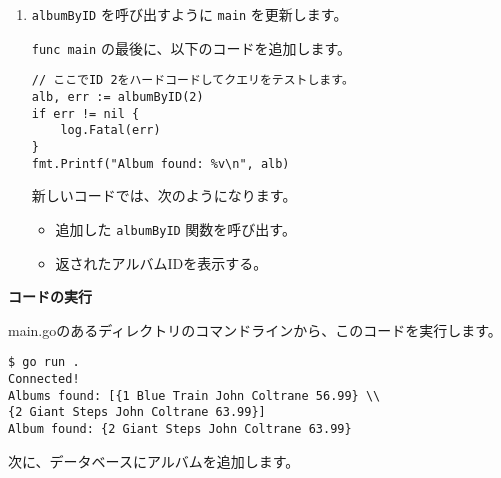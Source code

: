 \begin{enumerate}
\item
  \texttt{albumByID} を呼び出すように \texttt{main} を更新します。

  \texttt{func\ main} の最後に、以下のコードを追加します。

\begin{lstlisting}[numbers=none]
// ここでID 2をハードコードしてクエリをテストします。
alb, err := albumByID(2)
if err != nil {
    log.Fatal(err)
}
fmt.Printf("Album found: %v\n", alb)
\end{lstlisting}


  新しいコードでは、次のようになります。

  \begin{itemize}
  \item
    追加した \texttt{albumByID} 関数を呼び出す。
  \item
    返されたアルバムIDを表示する。
  \end{itemize}
\end{enumerate}

\textbf{コードの実行}

main.goのあるディレクトリのコマンドラインから、このコードを実行します。

\begin{lstlisting}[numbers=none]
$ go run .
Connected!
Albums found: [{1 Blue Train John Coltrane 56.99} \\
{2 Giant Steps John Coltrane 63.99}]
Album found: {2 Giant Steps John Coltrane 63.99}
\end{lstlisting}

次に、データベースにアルバムを追加します。

